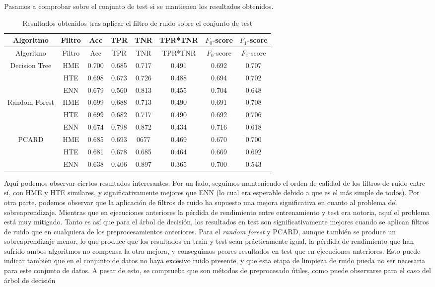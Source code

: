 \documentclass[
  a4paper,
,tablecaptionabove
]{scrartcl}
\begin{document}
Pasamos a comprobar sobre el conjunto de test si se mantienen los
resultados obtenidos.

\begin{longtable}[]{@{}cccccccc@{}}
\caption{Resultados obtenidos tras aplicar el filtro de ruido sobre el
conjunto de test}\tabularnewline
\toprule
Algoritmo & Filtro & Acc & TPR & TNR & TPR*TNR & \(F_0\)-score &
\(F_1\)-score\tabularnewline
\midrule
\endfirsthead
\toprule
Algoritmo & Filtro & Acc & TPR & TNR & TPR*TNR & \(F_0\)-score &
\(F_1\)-score\tabularnewline
\midrule
\endhead
Decision Tree & HME & 0.700 & 0.685 & 0.717 & 0.491 & 0.692 &
0.707\tabularnewline
& HTE & 0.698 & 0.673 & 0.726 & 0.488 & 0.694 & 0.702\tabularnewline
& ENN & 0.679 & 0.560 & 0.813 & 0.455 & 0.704 & 0.648\tabularnewline
\midrule
Random Forest & HME & 0.699 & 0.688 & 0.713 & 0.490 & 0.691 &
0.708\tabularnewline
& HTE & 0.699 & 0.682 & 0.717 & 0.490 & 0.692 & 0.706\tabularnewline
& ENN & 0.674 & 0.798 & 0.872 & 0.434 & 0.716 & 0.618\tabularnewline
\midrule
PCARD & HME & 0.685 & 0.693 & 0677 & 0.469 & 0.670 &
0.700\tabularnewline
& HTE & 0.681 & 0.678 & 0.685 & 0.464 & 0.669 & 0.692\tabularnewline
& ENN & 0.638 & 0.406 & 0.897 & 0.365 & 0.700 & 0.543\tabularnewline
\bottomrule
\end{longtable}

Aquí podemos observar ciertos resultados interesantes. Por un lado,
seguimos manteniendo el orden de calidad de los filtros de ruido entre
sí, con HME y HTE similares, y significativamente mejores que ENN (lo
cual era esperable debido a que es el más simple de todos). Por otra
parte, podemos observar que la aplicación de filtros de ruido ha
supuesto una mejora significativa en cuanto al problema del
sobreaprendizaje. Mientras que en ejecuciones anteriores la pérdida de
rendimiento entre entrenamiento y test era notoria, aquí el problema
está muy mitigado. Tanto es así que para el árbol de decisión, los
resultados en test son significativamente mejores cuando se aplican
filtros de ruido que en cualquiera de los preprocesamientos anteriores.
Para el \emph{random forest} y PCARD, aunque también se produce un
sobreaprendizaje menor, lo que produce que los resultados en train y
test sean prácticamente igual, la pérdida de rendimiento que han sufrido
ambos algoritmos no compensa la otra mejora, y conseguimos peores
resultados en test que en ejecuciones anteriores. Esto puede indicar
también que en el conjunto de datos no haya excesivo ruido presente, y
que esta etapa de limpieza de ruido pueda no ser necesaria para este
conjunto de datos. A pesar de esto, se comprueba que son métodos de
preprocesado útiles, como puede observarse para el caso del árbol de
decisión
\end{document}
